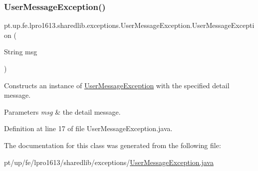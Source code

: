 \subsubsection{\texorpdfstring{User\+Message\+Exception()}{UserMessageException()}}
{\footnotesize\ttfamily pt.\+up.\+fe.\+lpro1613.\+sharedlib.\+exceptions.\+User\+Message\+Exception.\+User\+Message\+Exception (\begin{DoxyParamCaption}\item[{String}]{msg }\end{DoxyParamCaption})}

Constructs an instance of {\ttfamily \hyperlink{classpt_1_1up_1_1fe_1_1lpro1613_1_1sharedlib_1_1exceptions_1_1_user_message_exception}{User\+Message\+Exception}} with the specified detail message.


\begin{DoxyParams}{Parameters}
{\em msg} & the detail message. \\
\hline
\end{DoxyParams}


Definition at line 17 of file User\+Message\+Exception.\+java.



The documentation for this class was generated from the following file\+:\begin{DoxyCompactItemize}
\item 
pt/up/fe/lpro1613/sharedlib/exceptions/\hyperlink{_user_message_exception_8java}{User\+Message\+Exception.\+java}\end{DoxyCompactItemize}
